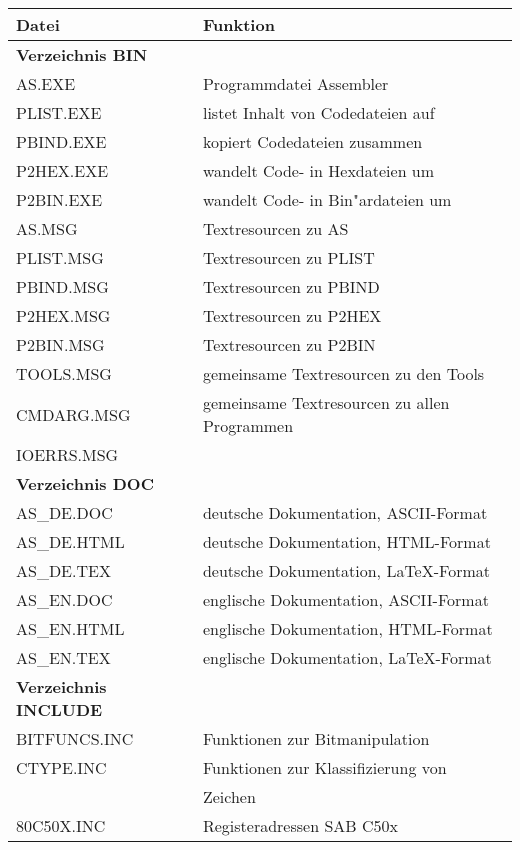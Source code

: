 \documentclass[12pt,a4paper,twoside]{report}
\begin{document}
\begin{table*}[htp]
\begin{center}\begin{tabular}{|l|l|}
\hline
Datei             & Funktion \\
\hline
\hline
{\bf Verzeichnis BIN} & \\
\hline
AS.EXE            & Programmdatei Assembler \\
PLIST.EXE         & listet Inhalt von Codedateien auf \\
PBIND.EXE         & kopiert Codedateien zusammen \\
P2HEX.EXE         & wandelt Code- in Hexdateien um \\
P2BIN.EXE         & wandelt Code- in Bin"ardateien um \\
AS.MSG            & Textresourcen zu AS \\
PLIST.MSG         & Textresourcen zu PLIST \\
PBIND.MSG         & Textresourcen zu PBIND \\
P2HEX.MSG         & Textresourcen zu P2HEX \\
P2BIN.MSG         & Textresourcen zu P2BIN \\
TOOLS.MSG         & gemeinsame Textresourcen zu den Tools \\
CMDARG.MSG        & gemeinsame Textresourcen zu allen Programmen \\
IOERRS.MSG        & \\
\hline
\hline
{\bf Verzeichnis DOC} & \\
\hline
AS\_DE.DOC        & deutsche Dokumentation, ASCII-Format \\
AS\_DE.HTML       & deutsche Dokumentation, HTML-Format \\
AS\_DE.TEX        & deutsche Dokumentation, LaTeX-Format \\
AS\_EN.DOC        & englische Dokumentation, ASCII-Format \\
AS\_EN.HTML       & englische Dokumentation, HTML-Format \\
AS\_EN.TEX        & englische Dokumentation, LaTeX-Format \\
\hline
\hline
{\bf Verzeichnis INCLUDE} & \\
\hline
BITFUNCS.INC      & Funktionen zur Bitmanipulation \\
CTYPE.INC         & Funktionen zur Klassifizierung von \\
                  & Zeichen \\
80C50X.INC        & Registeradressen SAB C50x \\

\end{tabular}
\end{center}
\end{table*}
\end{document}
